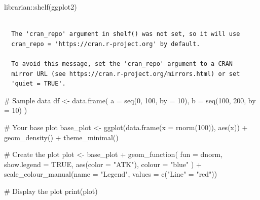 \documentclass[
  letterpaper,
  DIV=11,
  numbers=noendperiod]{scrreprt}
\newenvironment{Shaded}{\begin{snugshade}}{\end{snugshade}}
\newcommand{\AttributeTok}[1]{\textcolor[rgb]{0.40,0.45,0.13}{#1}}
\newcommand{\CommentTok}[1]{\textcolor[rgb]{0.37,0.37,0.37}{#1}}
\newcommand{\ConstantTok}[1]{\textcolor[rgb]{0.56,0.35,0.01}{#1}}
\newcommand{\DecValTok}[1]{\textcolor[rgb]{0.68,0.00,0.00}{#1}}
\newcommand{\FunctionTok}[1]{\textcolor[rgb]{0.28,0.35,0.67}{#1}}
\newcommand{\NormalTok}[1]{\textcolor[rgb]{0.00,0.23,0.31}{#1}}
\newcommand{\OtherTok}[1]{\textcolor[rgb]{0.00,0.23,0.31}{#1}}
\newcommand{\SpecialCharTok}[1]{\textcolor[rgb]{0.37,0.37,0.37}{#1}}
\newcommand{\StringTok}[1]{\textcolor[rgb]{0.13,0.47,0.30}{#1}}
\begin{document}
\begin{Shaded}
\begin{Highlighting}[]
\NormalTok{librarian}\SpecialCharTok{::}\FunctionTok{shelf}\NormalTok{(ggplot2)}
\end{Highlighting}
\end{Shaded}

\begin{verbatim}

  The 'cran_repo' argument in shelf() was not set, so it will use
  cran_repo = 'https://cran.r-project.org' by default.

  To avoid this message, set the 'cran_repo' argument to a CRAN
  mirror URL (see https://cran.r-project.org/mirrors.html) or set
  'quiet = TRUE'.
\end{verbatim}

\begin{Shaded}
\begin{Highlighting}[]
\CommentTok{\# Sample data}
\NormalTok{df }\OtherTok{\textless{}{-}} \FunctionTok{data.frame}\NormalTok{(}
  \AttributeTok{a =} \FunctionTok{seq}\NormalTok{(}\DecValTok{0}\NormalTok{, }\DecValTok{100}\NormalTok{, }\AttributeTok{by =} \DecValTok{10}\NormalTok{),}
  \AttributeTok{b =} \FunctionTok{seq}\NormalTok{(}\DecValTok{100}\NormalTok{, }\DecValTok{200}\NormalTok{, }\AttributeTok{by =} \DecValTok{10}\NormalTok{)}
\NormalTok{)}

\CommentTok{\# Your base plot}
\NormalTok{base\_plot }\OtherTok{\textless{}{-}} \FunctionTok{ggplot}\NormalTok{(}\FunctionTok{data.frame}\NormalTok{(}\AttributeTok{x =} \FunctionTok{rnorm}\NormalTok{(}\DecValTok{100}\NormalTok{)), }\FunctionTok{aes}\NormalTok{(x)) }\SpecialCharTok{+}
  \FunctionTok{geom\_density}\NormalTok{() }\SpecialCharTok{+}
  \FunctionTok{theme\_minimal}\NormalTok{()}

\CommentTok{\# Create the plot}
\NormalTok{plot }\OtherTok{\textless{}{-}}\NormalTok{ base\_plot }\SpecialCharTok{+} \FunctionTok{geom\_function}\NormalTok{(}
  \AttributeTok{fun =}\NormalTok{ dnorm,}
  \AttributeTok{show.legend =} \ConstantTok{TRUE}\NormalTok{,}
  \FunctionTok{aes}\NormalTok{(}\AttributeTok{color =} \StringTok{"ATK"}\NormalTok{),}
  \AttributeTok{colour =} \StringTok{"blue"}
\NormalTok{) }\SpecialCharTok{+} \FunctionTok{scale\_colour\_manual}\NormalTok{(}\AttributeTok{name =} \StringTok{"Legend"}\NormalTok{, }\AttributeTok{values =} \FunctionTok{c}\NormalTok{(}\StringTok{"Line"} \OtherTok{=} \StringTok{"red"}\NormalTok{))}

\CommentTok{\# Display the plot}
\FunctionTok{print}\NormalTok{(plot)}
\end{Highlighting}
\end{Shaded}
\end{document}
